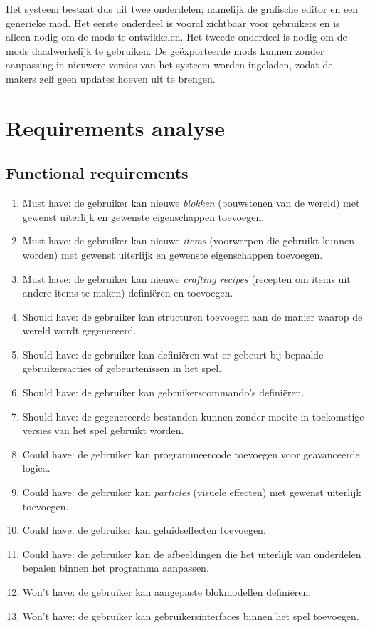 \documentclass{article}
\begin{document}
	Het systeem bestaat dus uit twee onderdelen; namelijk de grafische editor en een generieke mod. Het eerste onderdeel is vooral zichtbaar voor gebruikers en is alleen nodig om de mods te ontwikkelen. Het tweede onderdeel is nodig om de mods daadwerkelijk te gebruiken. De ge\"exporteerde mods kunnen zonder aanpassing in nieuwere versies van het systeem worden ingeladen, zodat de makers zelf geen updates hoeven uit te brengen.

\newpage

\section{Requirements analyse}
	\subsection{Functional requirements}
	\begin{enumerate}
		\item Must have: de gebruiker kan nieuwe \emph{blokken} (bouwstenen van de wereld) met gewenst uiterlijk en gewenste eigenschappen toevoegen.
		\item Must have: de gebruiker kan nieuwe \emph{items} (voorwerpen die gebruikt kunnen worden) met gewenst uiterlijk en gewenste eigenschappen toevoegen.
		\item Must have: de gebruiker kan nieuwe \emph{crafting recipes} (recepten om items uit andere items te maken) defini\"eren en toevoegen.
		
		\item Should have: de gebruiker kan structuren toevoegen aan de manier waarop de wereld wordt gegenereerd.
		\item Should have: de gebruiker kan defini\"eren wat er gebeurt bij bepaalde gebruikersacties of gebeurtenissen in het spel.
		\item Should have: de gebruiker kan gebruikerscommando's defini\"eren.
		\item Should have: de gegenereerde bestanden kunnen zonder moeite in toekomstige versies van het spel gebruikt worden.
		
		\item Could have: de gebruiker kan programmeercode toevoegen voor geavanceerde logica.
		\item Could have: de gebruiker kan \emph{particles} (visuele effecten) met gewenst uiterlijk toevoegen.
		\item Could have: de gebruiker kan geluidseffecten toevoegen.
		\item Could have: de gebruiker kan de afbeeldingen die het uiterlijk van onderdelen bepalen binnen het programma aanpassen.
		
		\item Won't have: de gebruiker kan aangepaste blokmodellen defini\"eren.
		\item Won't have: de gebruiker kan gebruikersinterfaces binnen het spel toevoegen.
	\end{enumerate}
\end{document}
